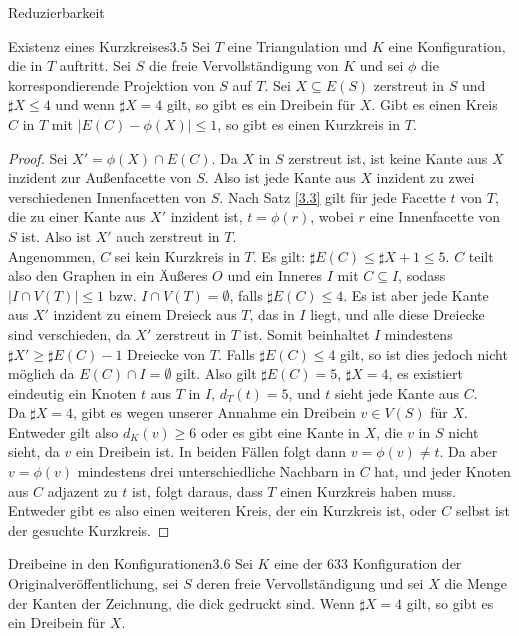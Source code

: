 \begin{section}{Reduzierbarkeit}
 \begin{satzl}{Existenz eines Kurzkreises}{3.5}
  Sei $T$ eine Triangulation und $K$ eine Konfiguration, die in $T$ auftritt. Sei $S$ die freie Vervollständigung von $K$ und sei $\phi$ die korrespondierende Projektion von $S$ auf $T$. Sei $X \subseteq E(S)$ zerstreut in $S$ und $\sharp X \leq 4$ und wenn $\sharp X = 4$ gilt, so gibt es ein Dreibein für $X$. Gibt es einen Kreis $C$ in $T$ mit $|E(C) - \phi(X)| \leq 1$, so gibt es einen Kurzkreis in $T$.
 \end{satzl}
 \begin{proof}
  Sei $X' = \phi(X) \cap E(C)$. Da $X$ in $S$ zerstreut ist, ist keine Kante aus $X$ inzident zur Außenfacette von $S$. Also ist jede Kante aus $X$ inzident zu zwei verschiedenen Innenfacetten von $S$. Nach Satz \ref{3.3} gilt für jede Facette $t$ von $T$, die zu einer Kante aus $X'$ inzident ist, $t=\phi(r)$, wobei $r$ eine Innenfacette von $S$ ist. Also ist $X'$ auch zerstreut in $T$.\\
  Angenommen, $C$ sei kein Kurzkreis in $T$. Es gilt: $\sharp E(C) \leq \sharp X +1 \leq 5$. $C$ teilt also den Graphen in ein Äußeres $O$ und ein Inneres $I$ mit $C \subseteq I$, sodass $|I \cap V(T)| \leq 1$ bzw. $I \cap V(T) = \emptyset$, falls $\sharp E(C) \leq 4$. Es ist aber jede Kante aus $X'$ inzident zu einem Dreieck aus $T$, das in $I$ liegt, und alle diese Dreiecke sind verschieden, da $X'$ zerstreut in $T$ ist. Somit beinhaltet $I$ mindestens $\sharp X' \geq \sharp E(C) -1$ Dreiecke von $T$. Falls $\sharp E(C) \leq 4$ gilt, so ist dies jedoch nicht möglich da $E(C) \cap I = \emptyset$ gilt. Also gilt $\sharp E(C) = 5$, $\sharp X = 4$, es existiert eindeutig ein Knoten $t$ aus $T$ in $I$, $d_T(t) = 5$, und $t$ sieht jede Kante aus $C$.\\
  Da $\sharp X = 4$, gibt es wegen unserer Annahme ein Dreibein $v\in V(S)$ für $X$. Entweder gilt also $d_K(v) \geq 6$ oder es gibt eine Kante in $X$, die $v$ in $S$ nicht sieht, da $v$ ein Dreibein ist. In beiden Fällen folgt dann $v=\phi(v)\neq t$. Da aber $v=\phi(v)$ mindestens drei unterschiedliche Nachbarn in $C$ hat, und jeder Knoten aus $C$ adjazent zu $t$ ist, folgt daraus, dass $T$ einen Kurzkreis haben muss. \\
  Entweder gibt es also einen weiteren Kreis, der ein Kurzkreis ist, oder $C$ selbst ist der gesuchte Kurzkreis.
 \end{proof}
 
 \begin{satzl}{Dreibeine in den Konfigurationen}{3.6}
  Sei $K$ eine der 633 Konfiguration der Originalveröffentlichung, sei $S$ deren freie Vervollständigung und sei $X$ die Menge der Kanten der Zeichnung, die dick gedruckt sind. Wenn $\sharp X = 4$ gilt, so gibt es ein Dreibein für $X$.
 \end{satzl}
 

\end{section}
